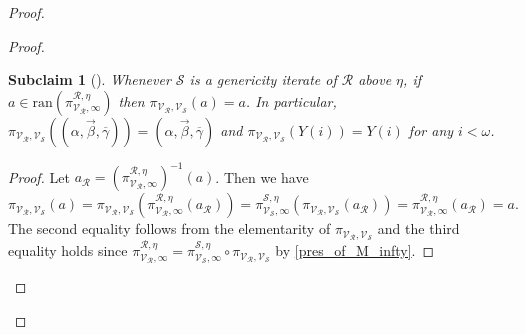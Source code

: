 \documentclass{amsart}
\newtheorem{subclaim}{Subclaim}[claim]
\begin{document}
\begin{proof}
\begin{proof}
    \begin{subclaim}[{\cite[Lemma 4.3]{CoveringChang}}]\label{stabilizing_parameters}
        Whenever $\mathcal{S}$ is a genericity iterate of $\mathcal{R}$ above $\eta$, if $a\in\mathrm{ran}(\pi^{\mathcal{R}, \eta}_{\mathcal{V}_{\mathcal{R}}, \infty})$ then $\pi_{\mathcal{V}_{\mathcal{R}}, \mathcal{V}_{\mathcal{S}}}(a)=a$.
        In particular, $\pi_{\mathcal{V}_{\mathcal{R}}, \mathcal{V}_{\mathcal{S}}}((\alpha, \vec{\beta}, \overline{\gamma}))=(\alpha, \vec{\beta}, \overline{\gamma})$ and $\pi_{\mathcal{V}_{\mathcal{R}}, \mathcal{V}_{\mathcal{S}}}(Y(i))=Y(i)$ for any $i<\omega$.
    \end{subclaim}
    \begin{proof}
        Let $a_{\mathcal{R}}=(\pi^{\mathcal{R}, \eta}_{\mathcal{V}_{\mathcal{R}}, \infty})^{-1}(a)$.
        Then we have
        \[
        \pi_{\mathcal{V}_{\mathcal{R}}, \mathcal{V}_{\mathcal{S}}}(a)
        =\pi_{\mathcal{V}_{\mathcal{R}}, \mathcal{V}_{\mathcal{S}}}(\pi^{\mathcal{R}, \eta}_{\mathcal{V}_{\mathcal{R}}, \infty}(a_{\mathcal{R}}))
        =\pi^{\mathcal{S}, \eta}_{\mathcal{V}_{\mathcal{S}}, \infty}(\pi_{\mathcal{V}_{\mathcal{R}}, \mathcal{V}_{\mathcal{S}}}(a_{\mathcal{R}}))
        =\pi^{\mathcal{R}, \eta}_{\mathcal{V}_{\mathcal{R}}, \infty}(a_{\mathcal{R}})=a.
        \]
        The second equality follows from the elementarity of $\pi_{\mathcal{V}_{\mathcal{R}}, \mathcal{V}_{\mathcal{S}}}$ and the third equality holds since $\pi^{\mathcal{R}, \eta}_{\mathcal{V}_{\mathcal{R}}, \infty}=\pi^{\mathcal{S}, \eta}_{\mathcal{V}_{\mathcal{S}}, \infty}\circ\pi_{\mathcal{V}_{\mathcal{R}}, \mathcal{V}_{\mathcal{S}}}$ by \cref{pres_of_M_infty}.
    \end{proof}


\end{proof}
\end{proof}
\end{document}
